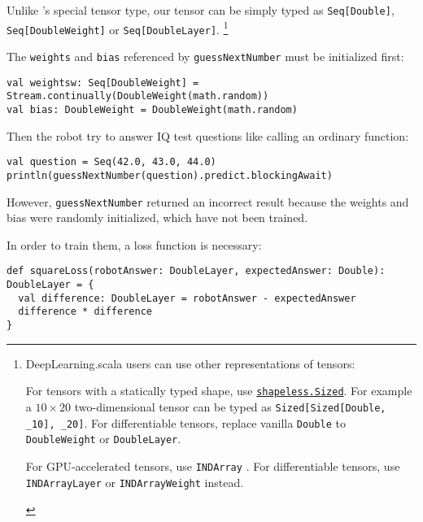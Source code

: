 Unlike \cite{chen2017typesafe}'s special tensor type, our tensor can be simply typed as \lstinline{Seq[Double]}, \lstinline{Seq[DoubleWeight]} or \lstinline{Seq[DoubleLayer]}.
\footnote{DeepLearning.scala users can use other representations of tensors:
\begin{enumerate*}
  \item For tensors with a statically typed shape, use \href{https://javadoc.io/page/com.chuusai/shapeless_2.11/latest/shapeless/Sized.html}{ \lstinline{shapeless.Sized}}. For example a $10\times20$ two-dimensional tensor can be typed as \lstinline{Sized[Sized[Double, _10], _20]}. For differentiable tensors, replace vanilla \lstinline{Double} to \lstinline{DoubleWeight} or \lstinline{DoubleLayer}.
  \item For GPU-accelerated tensors, use \lstinline{INDArray} \cite{skymind2017nd4j}. For differentiable tensors, use \lstinline{INDArrayLayer} or \lstinline{INDArrayWeight} instead.
\end{enumerate*}
}

The \lstinline{weights} and \lstinline{bias} referenced by \lstinline{guessNextNumber} must be initialized first:

\begin{lstlisting}[float={h t b p},caption={Weight initialization}]
val weightsw: Seq[DoubleWeight] = Stream.continually(DoubleWeight(math.random))
val bias: DoubleWeight = DoubleWeight(math.random)
\end{lstlisting}

Then the robot try to answer IQ test questions like calling an ordinary function:

\begin{lstlisting}[float={h t b p},caption={Inference on an untrained model}]
val question = Seq(42.0, 43.0, 44.0)
println(guessNextNumber(question).predict.blockingAwait)
\end{lstlisting}

However, \lstinline{guessNextNumber} returned an incorrect result because the weights and bias were randomly initialized, which have not been trained.

In order to train them, a loss function is necessary:

\begin{lstlisting}[float={h t b p},caption={The differentiable square loss function},label={squareLoss}]
def squareLoss(robotAnswer: DoubleLayer, expectedAnswer: Double): DoubleLayer = {
  val difference: DoubleLayer = robotAnswer - expectedAnswer
  difference * difference
}
\end{lstlisting}

